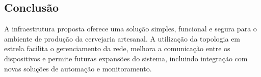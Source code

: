 \subsection{Conclusão}

A infraestrutura proposta oferece uma solução simples, funcional e segura para o ambiente de produção da cervejaria artesanal. A utilização da topologia em estrela facilita o gerenciamento da rede, melhora a comunicação entre os dispositivos e permite futuras expansões do sistema, incluindo integração com novas soluções de automação e monitoramento.